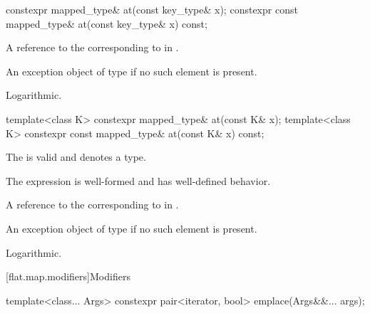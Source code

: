 %
\begin{itemdecl}
constexpr mapped_type&       at(const key_type& x);
constexpr const mapped_type& at(const key_type& x) const;
\end{itemdecl}

\begin{itemdescr}
\pnum
\returns
A reference to the  corresponding
to  in .

\pnum
\throws
An exception object of type  if
no such element is present.

\pnum
\complexity
Logarithmic.
\end{itemdescr}

%
\begin{itemdecl}
template<class K> constexpr mapped_type&       at(const K& x);
template<class K> constexpr const mapped_type& at(const K& x) const;
\end{itemdecl}

\begin{itemdescr}
\pnum
\constraints
The  
is valid and denotes a type.

\pnum
\expects
The expression  is well-formed and has well-defined behavior.

\pnum
\returns
A reference to the  corresponding to
 in .

\pnum
\throws
An exception object of type 
if no such element is present.

\pnum
\complexity
Logarithmic.
\end{itemdescr}

[flat.map.modifiers]{Modifiers}

%
\begin{itemdecl}
template<class... Args> constexpr pair<iterator, bool> emplace(Args&&... args);
\end{itemdecl}

